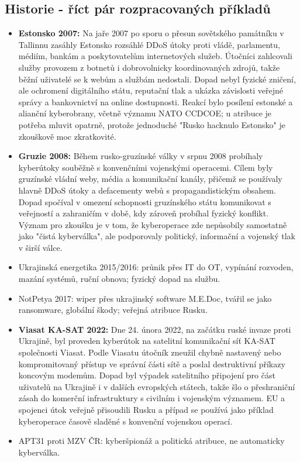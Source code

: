 \documentclass[10pt,a4paper]{article}
\newcommand{\blok}[1]{\subsection*{#1}}
\begin{document}
\blok{Historie - říct pár rozpracovaných příkladů}
\begin{itemize}
  \item \textbf{Estonsko 2007:} Na jaře 2007 po sporu o přesun sovětského památníku v Tallinnu zasáhly Estonsko rozsáhlé DDoS útoky proti vládě, parlamentu, médiím, bankám a poskytovatelům internetových služeb. Útočníci zahlcovali služby provozem z botnetů i dobrovolnicky koordinovaných zdrojů, takže běžní uživatelé se k webům a službám nedostali. Dopad nebyl fyzické zničení, ale ochromení digitálního státu, reputační tlak a ukázka závislosti veřejné správy a bankovnictví na online dostupnosti. Reakcí bylo posílení estonské a alianční kyberobrany, včetně významu NATO CCDCOE; u atribuce je potřeba mluvit opatrně, protože jednoduché "Rusko hacknulo Estonsko" je zkouškově moc zkratkovité.
  \item \textbf{Gruzie 2008:} Během rusko-gruzínské války v srpnu 2008 probíhaly kyberútoky souběžně s konvenčními vojenskými operacemi. Cílem byly gruzínské vládní weby, média a komunikační kanály, přičemž se používaly hlavně DDoS útoky a defacementy webů s propagandistickým obsahem. Dopad spočíval v omezení schopnosti gruzínského státu komunikovat s veřejností a zahraničím v době, kdy zároveň probíhal fyzický konflikt. Význam pro zkoušku je v tom, že kyberoperace zde nepůsobily samostatně jako "čistá kyberválka", ale podporovaly politický, informační a vojenský tlak v širší válce.
  \item Ukrajinská energetika 2015/2016: průnik přes IT do OT, vypínání rozvoden, mazání systémů, ruční obnova; fyzický dopad na službu.
  \item NotPetya 2017: wiper přes ukrajinský software M.E.Doc, tvářil se jako ransomware, globální škody; veřejná atribuce Rusku.
  \item \textbf{Viasat KA-SAT 2022:} Dne 24. února 2022, na začátku ruské invaze proti Ukrajině, byl proveden kyberútok na satelitní komunikační síť KA-SAT společnosti Viasat. Podle Viasatu útočník zneužil chybně nastavený nebo kompromitovaný přístup ve správní části sítě a poslal destruktivní příkazy koncovým modemům. Dopad byl výpadek satelitního připojení pro část uživatelů na Ukrajině i v dalších evropských státech, takže šlo o přeshraniční zásah do komerční infrastruktury s civilním i vojenským významem. EU a spojenci útok veřejně přisoudili Rusku a případ se používá jako příklad kyberoperace časově sladěné s konvenční vojenskou operací.
  \item APT31 proti MZV ČR: kyberšpionáž a politická atribuce, ne automaticky kyberválka.
\end{itemize}
\end{document}
